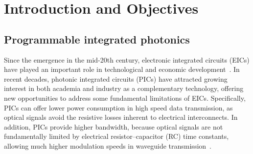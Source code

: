 
\chapter{Introduction and Objectives} \label{chap:intro}

\section{Programmable integrated photonics} \label{sec:pip}
Since the emergence in the mid-20th century, electronic integrated circuits (EICs) have played an important role in technological and economic development~\cite{sedra2011microelectronic}.
In recent decades, photonic integrated circuits (PICs) have attracted growing interest in both academia and industry as a complementary technology, offering new opportunities to address some fundamental limitations of EICs.
Specifically, PICs can offer lower power consumption in high speed data transmission, as optical signals avoid the resistive losses inherent to electrical interconnects.
In addition, PICs provide higher bandwidth, because optical signals are not fundamentally limited by electrical resistor–capacitor (RC) time constants, allowing much higher modulation speeds in waveguide transmission~\cite{tian2025photonic, 81373}.

